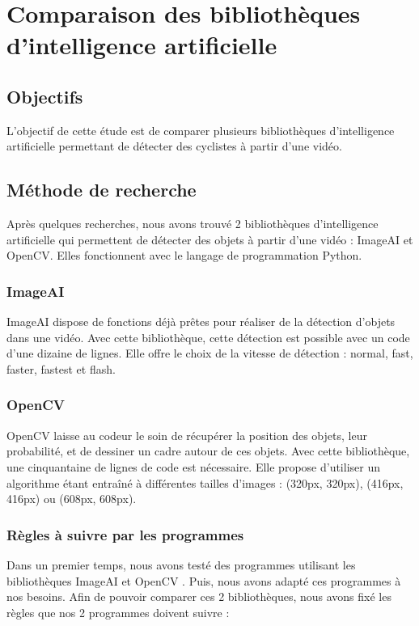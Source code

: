 \section{Comparaison des bibliothèques d'intelligence artificielle}
\label{sec:comparaisonIA}

\subsection{Objectifs}
\label{sec:comparaisonIA:objectifs}

L'objectif de cette étude est de comparer plusieurs bibliothèques d'intelligence artificielle
permettant de détecter des cyclistes à partir d'une vidéo.

\subsection{Méthode de recherche}
\label{sec:comparaisonIA:methode_recherche}

Après quelques recherches, nous avons trouvé 2 bibliothèques d'intelligence artificielle
qui permettent de détecter des objets à partir d'une vidéo : ImageAI et OpenCV.
Elles fonctionnent avec le langage de programmation Python.

\subsubsection{ImageAI}
\label{sec:comparaisonIA:methode_recherche:imageAI}

ImageAI dispose de fonctions déjà prêtes pour réaliser de la détection d'objets dans une vidéo.
Avec cette bibliothèque, cette détection est possible avec un code d'une dizaine de lignes.
Elle offre le choix de la vitesse de détection : normal, fast, faster, fastest et flash.

\subsubsection{OpenCV}
\label{sec:comparaisonIA:methode_recherche:openCV}

OpenCV laisse au codeur le soin de récupérer la position des objets, leur probabilité, et de dessiner un cadre autour de ces objets.
Avec cette bibliothèque, une cinquantaine de lignes de code est nécessaire.
Elle propose d'utiliser un algorithme étant entraîné à différentes tailles d'images : (320px, 320px), (416px, 416px) ou (608px, 608px).

\subsubsection{Règles à suivre par les programmes}
\label{sec:comparaisonIA:methode_recherche:regles}
Dans un premier temps, nous avons testé des programmes utilisant les bibliothèques ImageAI et OpenCV \cite{ImageAI, OpenCV}.
Puis, nous avons adapté ces programmes à nos besoins.
Afin de pouvoir comparer ces 2 bibliothèques, nous avons fixé les règles que nos 2 programmes doivent suivre :

